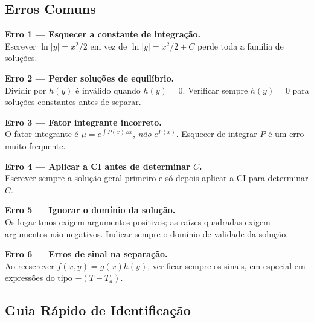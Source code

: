 \subsection{Erros Comuns}

\begin{warnbox}
  \textbf{Erro 1 --- Esquecer a constante de integração.}\\
  Escrever $\ln|y| = x^2/2$ em vez de $\ln|y| = x^2/2 + C$ perde toda a família de
  soluções.
\end{warnbox}

\begin{warnbox}
  \textbf{Erro 2 --- Perder soluções de equilíbrio.}\\
  Dividir por $h(y)$ é inválido quando $h(y)=0$. Verificar sempre $h(y)=0$ para soluções
  constantes antes de separar.
\end{warnbox}

\begin{warnbox}
  \textbf{Erro 3 --- Fator integrante incorreto.}\\
  O fator integrante é $\mu = e^{\int P(x)\,\dd x}$, \emph{não} $e^{P(x)}$.
  Esquecer de integrar $P$ é um erro muito frequente.
\end{warnbox}

\begin{warnbox}
  \textbf{Erro 4 --- Aplicar a CI antes de determinar $C$.}\\
  Escrever sempre a solução geral primeiro e só depois aplicar a CI para determinar $C$.
\end{warnbox}

\begin{warnbox}
  \textbf{Erro 5 --- Ignorar o domínio da solução.}\\
  Os logaritmos exigem argumentos positivos; as raízes quadradas exigem argumentos não
  negativos. Indicar sempre o domínio de validade da solução.
\end{warnbox}

\begin{warnbox}
  \textbf{Erro 6 --- Erros de sinal na separação.}\\
  Ao reescrever $f(x,y)=g(x)h(y)$, verificar sempre os sinais, em especial em
  expressões do tipo $-(T-T_a)$.
\end{warnbox}

\subsection{Guia Rápido de Identificação}

